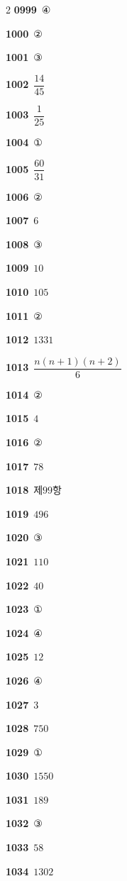 \documentclass[10pt,a4paper]{article}
\begin{document}
\begin{multicols}{2}
\noindent\textbf{0999}\ ④\par
\noindent\textbf{1000}\ ②\par
\noindent\textbf{1001}\ ③\par
\noindent\textbf{1002}\ $\dfrac{14}{45}$\par
\noindent\textbf{1003}\ $\dfrac{1}{25}$\par
\noindent\textbf{1004}\ ①\par
\noindent\textbf{1005}\ $\dfrac{60}{31}$\par
\noindent\textbf{1006}\ ②\par
\noindent\textbf{1007}\ $6$\par
\noindent\textbf{1008}\ ③\par
\noindent\textbf{1009}\ $10$\par
\noindent\textbf{1010}\ $105$\par
\noindent\textbf{1011}\ ②\par
\noindent\textbf{1012}\ $1331$\par
\noindent\textbf{1013}\ $\dfrac{n(n+1)(n+2)}{6}$\par
\noindent\textbf{1014}\ ②\par
\noindent\textbf{1015}\ $4$\par
\noindent\textbf{1016}\ ②\par
\noindent\textbf{1017}\ $78$\par
\noindent\textbf{1018}\ 제$99$항\par
\noindent\textbf{1019}\ $496$\par
\noindent\textbf{1020}\ ③\par
\noindent\textbf{1021}\ $110$\par
\noindent\textbf{1022}\ $40$\par
\noindent\textbf{1023}\ ①\par
\noindent\textbf{1024}\ ④\par
\noindent\textbf{1025}\ $12$\par
\noindent\textbf{1026}\ ④\par
\noindent\textbf{1027}\ $3$\par
\noindent\textbf{1028}\ $750$\par
\noindent\textbf{1029}\ ①\par
\noindent\textbf{1030}\ $1550$\par
\noindent\textbf{1031}\ $189$\par
\noindent\textbf{1032}\ ③\par
\noindent\textbf{1033}\ $58$\par
\noindent\textbf{1034}\ $1302$\par

\end{multicols}
\end{document}
